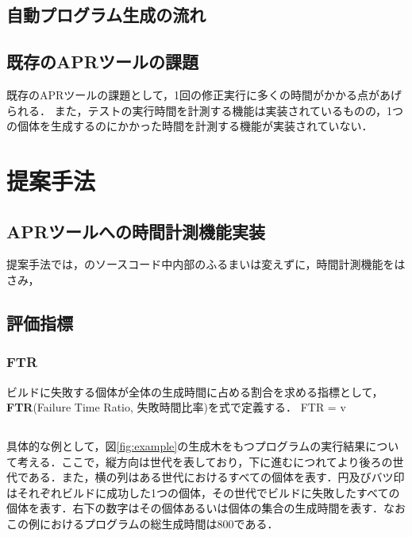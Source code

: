 \documentclass[uplatex,dvipdfmx,a4paper]{jsarticle}
\begin{document}
\subsection{自動プログラム生成の流れ} \label{sec:prev_apg}

\subsection{既存のAPRツールの課題} \label{sec:prev_challenge}

既存のAPRツールの課題として，1回の修正実行に多くの時間がかかる点があげられる．
また，テストの実行時間を計測する機能は実装されているものの，1つの個体を生成するのにかかった時間を計測する機能が実装されていない．


\clearpage
\section{提案手法} \label{sec:prop}
\subsection{APRツールへの時間計測機能実装} \label{sec:impl}
提案手法では，\kgp のソースコード中内部のふるまいは変えずに，時間計測機能をはさみ，
\subsection{評価指標}\label{sec:index}
\subsubsection{FTR}\label{sec:FTR}
ビルドに失敗する個体が全体の生成時間に占める割合を求める指標として，{\bf FTR}(Failure Time Ratio, 失敗時間比率)を式\label{}で定義する．
FTR =  v
\subsection{}
具体的な例として，図\ref{fig:example}の生成木をもつプログラムの実行結果について考える．ここで，縦方向は世代を表しており，下に進むにつれてより後ろの世代である．また，横の列はある世代におけるすべての個体を表す．円及びバツ印はそれぞれビルドに成功した1つの個体，その世代でビルドに失敗したすべての個体を表す．右下の数字はその個体あるいは個体の集合の生成時間を表す．なおこの例におけるプログラムの総生成時間は800である．
\end{document}
